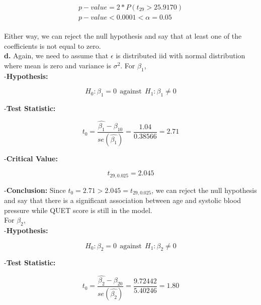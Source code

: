 \documentclass{article}
\begin{document}
\begin{align}
    \begin{split}
         p-value = 2*P(t_{29} > 25.9170)
         \\
         p-value < 0.0001 < \alpha = 0.05
    \end{split}
\end{align}

Either way, we can reject the null hypothesis and say that at least one of the coefficients is not equal to zero.
\\

\textbf{d.} Again, we need to assume that $\epsilon$ is distributed iid with normal distribution where mean is zero and variance is $\sigma^2$. For $\beta_1$,
\\

-\textbf{Hypothesis:} 

\begin{equation}
    H_0: \beta_1 = 0 \ \ \text{against} \ \  H_1: \beta_1 \neq 0
\end{equation}

-\textbf{Test Statistic:}


\begin{equation}
    t_0 = \frac{\hat{\beta_1} - \beta_{10}}{se(\hat{\beta_1})} = \frac{1.04}{0.38566} = 2.71
\end{equation}

-\textbf{Critical Value:}

\begin{equation}
    t_{29,0.025} = 2.045
\end{equation}

-\textbf{Conclusion:}
Since $t_0 = 2.71 > 2.045 =  t_{29,0.025}$, we can reject the null hypothesis and say that there is a significant association between age and systolic blood pressure while QUET score is still in the model.
\\

For $\beta_2$,
\\

-\textbf{Hypothesis:} 

\begin{equation}
    H_0: \beta_2 = 0 \ \ \text{against} \ \  H_1: \beta_2 \neq 0
\end{equation}

-\textbf{Test Statistic:}

\begin{equation}
    t_0 = \frac{\hat{\beta_2} - \beta_{20}}{se(\hat{\beta_2})} = \frac{9.72442}{5.40246} = 1.80
\end{equation}
\end{document}
